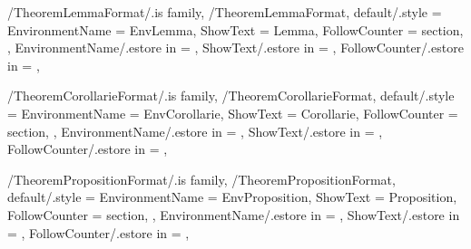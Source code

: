 
\pgfkeys
{
  /TheoremLemmaFormat/.is family, /TheoremLemmaFormat,
  default/.style =
  {
    EnvironmentName = {EnvLemma},
    ShowText = {Lemma},
    FollowCounter = section,
  },
  EnvironmentName/.estore in = \GetTheoremLemmaFormatEnvironmentName,
  ShowText/.estore in = \GetTheoremLemmaFormatShowText,
  FollowCounter/.estore in = \GetTheoremLemmaFormatFollowCounter,
} %

\newcommand{\InsertLemma}[2][\empty]
{%
  \InsertTheoremContent[#1]{\GetTheoremLemmaFormatEnvironmentName}{#2}%
} %

\newcommand{\InitTheoremLemmaFormat}
{%
  \ifthenelse{\equal{\GetTheoremLemmaFormatFollowCounter}{\empty}}%
  {%
    \newtheorem{%
      \GetTheoremLemmaFormatEnvironmentName}{%
      \GetTheoremLemmaFormatShowText}%
  }%
  {%
    \newtheorem{%
      \GetTheoremLemmaFormatEnvironmentName}{%
      \GetTheoremLemmaFormatShowText}[%
      \GetTheoremLemmaFormatFollowCounter]%
  }%
} %


\pgfkeys
{
  /TheoremCorollarieFormat/.is family, /TheoremCorollarieFormat,
  default/.style =
  {
    EnvironmentName = {EnvCorollarie},
    ShowText = {Corollarie},
    FollowCounter = section,
  },
  EnvironmentName/.estore in = \GetTheoremCorollarieFormatEnvironmentName,
  ShowText/.estore in = \GetTheoremCorollarieFormatShowText,
  FollowCounter/.estore in = \GetTheoremCorollarieFormatFollowCounter,
} %

\newcommand{\InsertCorollarie}[2][\empty]
{%
  \InsertTheoremContent[#1]{\GetTheoremCorollarieFormatEnvironmentName}{#2}%
} %

\newcommand{\InitTheoremCorollarieFormat}
{%
  \ifthenelse{\equal{\GetTheoremCorollarieFormatFollowCounter}{\empty}}%
  {%
    \newtheorem{%
      \GetTheoremCorollarieFormatEnvironmentName}{%
      \GetTheoremCorollarieFormatShowText}%
  }%
  {%
    \newtheorem{%
      \GetTheoremCorollarieFormatEnvironmentName}{%
      \GetTheoremCorollarieFormatShowText}[%
      \GetTheoremCorollarieFormatFollowCounter]%
  }%
} %


\pgfkeys
{
  /TheoremPropositionFormat/.is family, /TheoremPropositionFormat,
  default/.style =
  {
    EnvironmentName = {EnvProposition},
    ShowText = {Proposition},
    FollowCounter = section,
  },
  EnvironmentName/.estore in = \GetTheoremPropositionFormatEnvironmentName,
  ShowText/.estore in = \GetTheoremPropositionFormatShowText,
  FollowCounter/.estore in = \GetTheoremPropositionFormatFollowCounter,
} %

